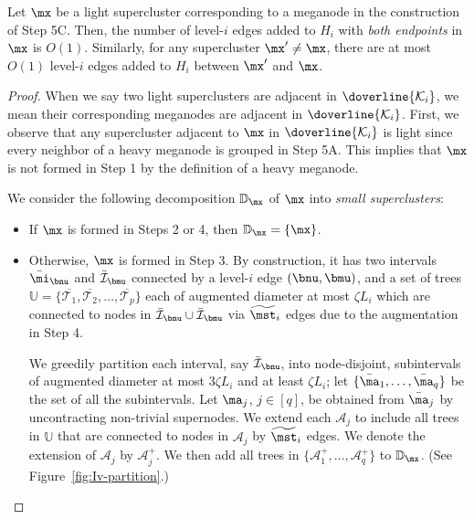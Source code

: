 \begin{lemma}\label{lm:key-incident}
	Let $\mx$ be a light supercluster corresponding to a meganode in the construction of Step 5C. Then, the number of level-$i$ edges added to $H_i$ with \emph{both endpoints} in $\mx$ is $O(1)$. Similarly,  for any supercluster $\mx' \not = \mx$, there are at most $O(1)$ level-$i$ edges added to $H_i$ between $\mx'$ and $\mx$.
\end{lemma}
\begin{proof} When we say two light superclusters are adjacent in $\doverline{\mathcal{K}_i}$, we mean their corresponding meganodes are adjacent in $\doverline{\mathcal{K}_i}$.  First, we observe that any supercluster adjacent to $\mx$ in $\doverline{\mathcal{K}_i}$ is light since every neighbor of a heavy meganode is grouped in Step 5A. This implies that $\mx$ is not formed in Step 1  by the definition of a heavy meganode.
	
	We consider the following decomposition $\mathbb{D}_\mx$ of $\mx$ into \emph{small superclusters}:
	\begin{itemize}
		\item  If $\mx$ is formed in Steps 2 or 4, then $\mathbb{D}_\mx = \{\mx\}$.
		\item  Otherwise, $\mx$ is formed in Step 3. By construction, it has  two intervals $\bar\mi_{\bnu}$ and $ \bar{\mathcal{I}}_{\bmu}$ connected by a level-$i$ edge $(\bnu,\bmu)$, and a set of trees $\mathbb{U}= \{\overline{\mathcal{T}_1}, \overline{\mathcal{T}_2}, \ldots, \overline{\mathcal{T}_p}\}$  each of augmented diameter at most $\zeta L_i$ which are connected to nodes in $\bar{\mathcal{I}}_{\bnu}\cup \bar{\mathcal{I}}_{\bmu}$ via $\widetilde{\mst}_i$ edges due to the augmentation in Step 4. 

		We greedily partition each interval, say $\bar{\mathcal{I}}_{\bnu}$, into node-disjoint, subintervals of augmented diameter at most $3\zeta L_i$ and at least $\zeta L_i$; let $\{\bar{\ma}_1, \ldots, \bar{\ma}_{q}\}$ be the set of all the subintervals. Let $\ma_j$, $j\in [q]$, be obtained from $\bar{\ma}_j$ by uncontracting non-trivial supernodes. 
		We extend each $\mathcal{A}_j$ to include all trees in $\mathbb{U}$ that are connected to nodes in $\mathcal{A}_j$ by $\widetilde{\mst}_i$ edges. We denote the extension of $\mathcal{A}_j$ by $\mathcal{A}_j^{+}$. We then add all trees in  $\{\mathcal{A}_1^{+}, \ldots, \mathcal{A}_q^{+}\}$ to $\mathbb{D}_\mx$. (See Figure~\ref{fig:Iv-partition}.)
	\end{itemize}


\end{proof}
